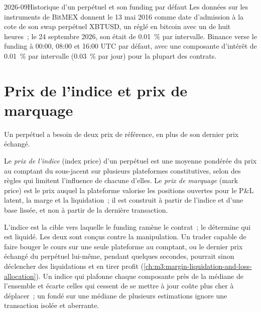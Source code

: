 \begin{dated}{2026-09}{Historique d'un perpétuel et son funding par défaut}\label{dat:m3:perpetual-futures:bitmex}
Les données sur les instruments de BitMEX donnent le 13 mai 2016 comme date d'admission à la cote de son swap perpétuel XBTUSD, un  réglé en bitcoin avec un  de huit heures~; le 24 septembre 2026, son 
était de 0.01~\% par intervalle. Binance verse le funding à 00:00, 08:00 et 16:00 UTC par défaut, avec une composante d'intérêt
de 0.01~\% par intervalle (0.03~\% par jour) pour la plupart des contrats.
\end{dated}

\section{Prix de l'indice et prix de marquage}

Un perpétuel a besoin de deux prix de référence, en plus de son dernier prix échangé.

\begin{definition}\label{def:m3:perpetual-futures:index}
Le \emph{prix de l'indice} (index price) d'un perpétuel est une moyenne pondérée du prix au comptant du
sous-jacent sur plusieurs plateformes constitutives, selon des règles qui limitent l'influence de chacune d'elles. Le \emph{prix de
marquage} (mark price) est le prix auquel la plateforme valorise les positions ouvertes pour le P\&L latent, la marge
et la liquidation~; il est construit à partir de l'indice et d'une base lissée, et non à partir de la dernière transaction.
\end{definition}

L'indice est la cible vers laquelle le funding ramène le contrat~; le  détermine qui est liquidé. Les deux sont conçus
contre la manipulation. Un trader capable de faire bouger le cours sur une seule plateforme au comptant, ou le dernier prix
échangé du perpétuel lui-même, pendant quelques secondes, pourrait sinon déclencher des liquidations et en tirer profit
(\cref{ch:m3:margin-liquidation-and-loss-allocation}). Un indice qui plafonne chaque composante près de la médiane
de l'ensemble et écarte celles qui cessent de se mettre à jour coûte plus cher à déplacer~; un  fondé sur une
médiane de plusieurs estimations ignore une transaction isolée et aberrante.

